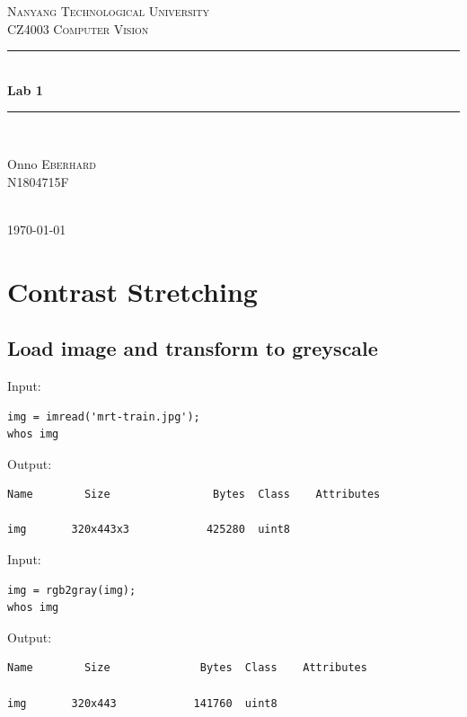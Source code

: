 \documentclass[12pt, a4paper]{article}
\begin{document}
\begin{titlepage}
\center
\textsc{\LARGE Nanyang Technological University}\\[20mm]
\textsc{\Large CZ4003 Computer Vision}\\[40mm]
\rule{\linewidth}{0.3mm}\\[8mm]
{\huge\bfseries Lab 1}\\[4mm]
\rule{\linewidth}{0.3mm}\\[25mm]
\begin{flushright} \large
Onno \textsc{Eberhard}\\
N1804715F
\end{flushright}~\\[45mm]
{\large \today}
\vfill %
\end{titlepage}

\tableofcontents
\newpage

\section{Contrast Stretching}
\subsection{Load image and transform to greyscale}
Input:
\begin{verbatim}
img = imread('mrt-train.jpg');
whos img
\end{verbatim}
Output:
\begin{verbatim}
Name        Size                Bytes  Class    Attributes

img       320x443x3            425280  uint8           
\end{verbatim}
Input:
\begin{verbatim}
img = rgb2gray(img);
whos img
\end{verbatim}
Output:
\begin{verbatim}
Name        Size              Bytes  Class    Attributes

img       320x443            141760  uint8       
\end{verbatim}
\end{document}
